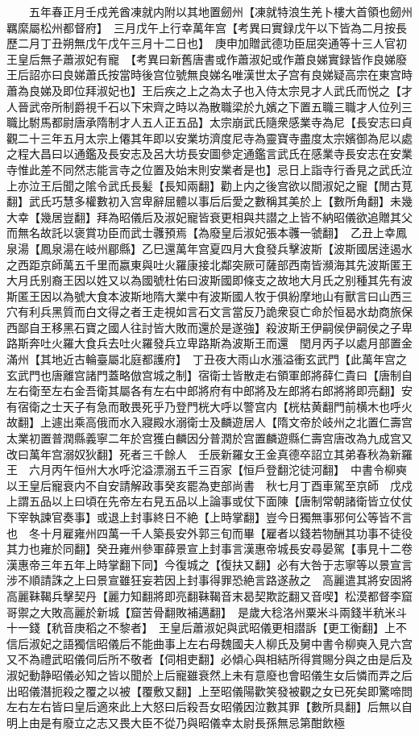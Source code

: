 　　五年春正月壬戍羌酋凍就内附以其地置劒州【凍就特浪生羌卜樓大首領也劒州羈縻屬松州都督府】　三月戊午上行幸萬年宫【考異曰實録戊午以下皆為二月按長歷二月丁丑朔無戊午戊午三月十二日也】　庚申加贈武德功臣屈突通等十三人官初王皇后無子蕭淑妃有寵　【考異曰新舊唐書或作蕭淑妃或作蕭良娣實録皆作良娣廢王后詔亦曰良娣蕭氏按當時後宫位號無良娣名唯漢世太子宫有良娣疑高宗在東宫時蕭為良娣及即位拜淑妃也】王后疾之上之為太子也入侍太宗見才人武氏而悦之【才人晉武帝所制爵視千石以下宋齊之時以為散職梁於九嬪之下置五職三職才人位列三職比駙馬都尉唐承隋制才人五人正五品】太宗崩武氏隨衆感業寺為尼【長安志曰貞觀二十三年五月太宗上僊其年即以安業坊濟度尼寺為靈寶寺盡度太宗嬪御為尼以處之程大昌曰以通鑑及長安志及呂大坊長安圖參定通鑑言武氏在感業寺長安志在安業寺惟此差不同然志能言寺之位置及始末則安業者是也】忌日上詣寺行香見之武氏泣上亦泣王后聞之隂令武氏長髪【長知兩翻】勸上内之後宫欲以間淑妃之寵【閒古莧翻】武氏巧慧多權數初入宫卑辭屈體以事后后愛之數稱其美於上【數所角翻】未幾大幸【幾居豈翻】拜為昭儀后及淑妃寵皆衰更相與共譛之上皆不納昭儀欲追贈其父而無名故託以褒賞功臣而武士彠預焉【為廢皇后淑妃張本彠一虢翻】　乙丑上幸鳳泉湯【鳳泉湯在岐州郿縣】乙巳還萬年宫夏四月大食發兵擊波斯【波斯國居逹遏水之西距京師萬五千里而嬴東與吐火羅康接北鄰突厥可薩部西南皆瀕海其先波斯匿王大月氏别裔王因以姓又以為國號杜佑曰波斯國即條支之故地大月氏之别種其先有波斯匿王因以為號大食本波斯地隋大業中有波斯國人牧于俱紛摩地山有獸言曰山西三穴有利兵黑質而白文得之者王走視如言石文言當反乃詭衆裒亡命於恒曷水劫商旅保西鄙自王移黑石寶之國人往討皆大敗而還於是遂強】殺波斯王伊嗣侯伊嗣侯之子卑路斯奔吐火羅大食兵去吐火羅發兵立卑路斯為波斯王而還　閏月丙子以處月部置金滿州【其地近古輪臺屬北庭都護府】　丁丑夜大雨山水漲溢衝玄武門【此萬年宫之玄武門也唐離宫諸門蓋略倣宫城之制】宿衛士皆散走右領軍郎將薛仁貴曰【唐制自左右衛至左右金吾衛其屬各有左右中郎將府有中郎將及左郎將右郎將將即亮翻】安有宿衛之士天子有急而敢畏死乎乃登門桄大呼以警宫内【桄枯黄翻門前横木也呼火故翻】上遽出乘高俄而水入寢殿水溺衛士及麟遊居人【隋文帝於岐州之北置仁壽宫太業初置普潤縣義寧二年於宫獲白麟因分普潤於宫置麟遊縣仁壽宫唐改為九成宫又改曰萬年宫溺奴狄翻】死者三千餘人　壬辰新羅女王金真德卒詔立其弟春秋為新羅王　六月丙午恒州大水呼沱溢漂溺五千三百家【恒戶登翻沱徒河翻】　中書令柳奭以王皇后寵衰内不自安請解政事癸亥罷為吏部尚書　秋七月丁酉車駕至京師　戊戍上謂五品以上曰頃在先帝左右見五品以上論事或仗下面陳【唐制常朝諸衛皆立仗仗下宰執諫官奏事】或退上封事終日不絶【上時掌翻】豈今日獨無事邪何公等皆不言也　冬十月雇雍州四萬一千人築長安外郭三旬而畢【雇者以錢若物酬其功事不徒役其力也雍於同翻】癸丑雍州參軍薛景宣上封事言漢惠帝城長安尋晏駕【事見十二卷漢惠帝三年五年上時掌翻下同】今復城之【復扶又翻】必有大咎于志寧等以景宣言涉不順請誅之上曰景宣雖狂妄若因上封事得罪恐絶言路遂赦之　高麗遣其將安固將高麗靺鞨兵擊契丹【麗力知翻將即亮翻靺鞨音末曷契欺訖翻又音喫】松漠都督李窟哥禦之大敗高麗於新城【窟苦骨翻敗補邁翻】　是歲大稔洛州粟米斗兩錢半秔米斗十一錢【秔音庚稻之不黎者】　王皇后蕭淑妃與武昭儀更相譛訴【更工衡翻】上不信后淑妃之語獨信昭儀后不能曲事上左右母魏國夫人柳氏及舅中書令柳奭入見六宫又不為禮武昭儀伺后所不敬者【伺相吏翻】必傾心與相結所得賞賜分與之由是后及淑妃動静昭儀必知之皆以聞於上后寵雖衰然上未有意廢也會昭儀生女后憐而弄之后出昭儀潛扼殺之覆之以被【覆敷又翻】上至昭儀陽歡笑發被觀之女已死矣即驚啼問左右左右皆曰皇后適來此上大怒曰后殺吾女昭儀因泣數其罪【數所具翻】后無以自明上由是有廢立之志又畏大臣不從乃與昭儀幸太尉長孫無忌第酣飲極